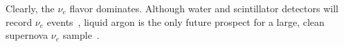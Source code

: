 
Clearly, the $\nu_e$
flavor dominates.  Although water and scintillator detectors will record $\nu_e$ events~\cite{Laha:2013hva,Laha:2014yua}, liquid argon is the only future prospect for a large, clean supernova $\nu_e$ sample~\cite{Scholberg:2012id}.





